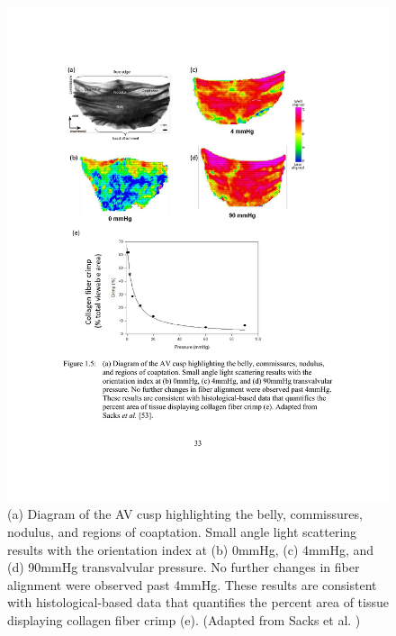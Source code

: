     
\begin{figure}
\centering
\includegraphics[width=5.5in]{Images/chapter1/salsaortic.pdf}
\caption{(a) Diagram of the AV cusp highlighting the belly, commissures, nodulus, and regions of coaptation. Small angle light scattering results with the orientation index at (b) 0mmHg, (c) 4mmHg, and (d) 90mmHg transvalvular pressure. No further changes in fiber alignment were observed past 4mmHg. These results are consistent with histological-based data that quantifies the percent area of tissue displaying collagen fiber crimp (e). (Adapted from Sacks et al. \cite{sacks_aortic_1998})}
\label{c1:fig:salsaortic}
\end{figure}

